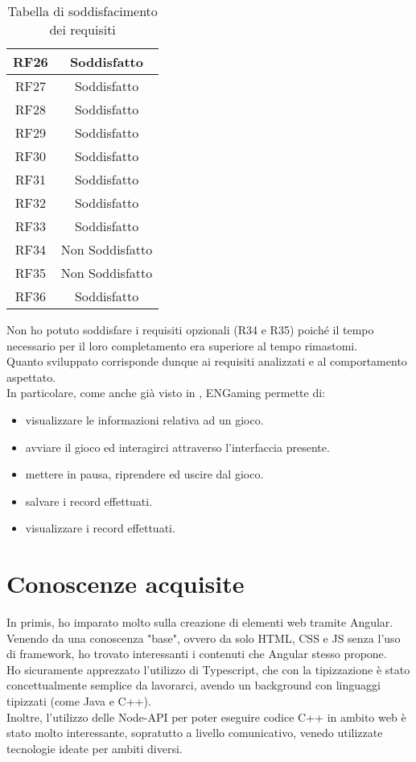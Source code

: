 \begin{longtable}{|c|c|}
    \hline
    RF26&Soddisfatto\\
    \hline
    RF27&Soddisfatto\\
    \hline
    RF28&Soddisfatto\\
    \hline
    RF29&Soddisfatto\\
    \hline
    RF30&Soddisfatto\\
    \hline
    RF31&Soddisfatto\\
    \hline
    RF32&Soddisfatto\\
    \hline
    RF33&Soddisfatto\\
    \hline
    RF34&Non Soddisfatto\\
    \hline
    RF35&Non Soddisfatto\\
    \hline
    RF36&Soddisfatto
    \hline
    \caption{Tabella di soddisfacimento dei requisiti}
\end{longtable}
Non ho potuto soddisfare i requisiti opzionali (R34 e R35) poiché il tempo necessario per il loro completamento era superiore al tempo rimastomi.\\
Quanto sviluppato corrisponde dunque ai requisiti analizzati e al comportamento aspettato.\\
In particolare, come anche già visto in , ENGaming permette di:
\begin{itemize}
    \item visualizzare le informazioni relativa ad un gioco.
    \item avviare il gioco ed interagirci attraverso l'interfaccia presente.
    \item mettere in pausa, riprendere ed uscire dal gioco.
    \item salvare i record effettuati.
    \item visualizzare i record effettuati.
\end{itemize}
\section{Conoscenze acquisite}
In primis, ho imparato molto sulla creazione di elementi web tramite Angular. Venendo da una conoscenza "base", ovvero da solo HTML, CSS e JS senza l'uso di framework, ho trovato interessanti i contenuti che Angular stesso propone.\\
Ho sicuramente apprezzato l'utilizzo di Typescript, che con la tipizzazione è stato concettualmente semplice da lavorarci, avendo un background con linguaggi tipizzati (come Java e C++).\\
Inoltre, l'utilizzo delle Node-API per poter eseguire codice C++ in ambito web è stato molto interessante, sopratutto a livello comunicativo, venedo utilizzate tecnologie ideate per ambiti diversi.
